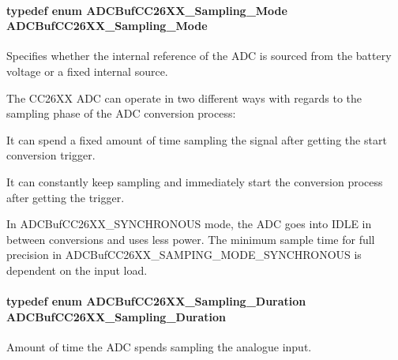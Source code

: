 \paragraph[{A\+D\+C\+Buf\+C\+C26\+X\+X\+\_\+\+Sampling\+\_\+\+Mode}]{\setlength{\rightskip}{0pt plus 5cm}typedef enum {\bf A\+D\+C\+Buf\+C\+C26\+X\+X\+\_\+\+Sampling\+\_\+\+Mode}  {\bf A\+D\+C\+Buf\+C\+C26\+X\+X\+\_\+\+Sampling\+\_\+\+Mode}}\label{_a_d_c_buf_c_c26_x_x_8h_a49a153bb66450bc16c5e2ac674fad698}


Specifies whether the internal reference of the A\+D\+C is sourced from the battery voltage or a fixed internal source. 

The C\+C26\+X\+X A\+D\+C can operate in two different ways with regards to the sampling phase of the A\+D\+C conversion process\+:
\begin{DoxyItemize}
\item It can spend a fixed amount of time sampling the signal after getting the start conversion trigger.
\item It can constantly keep sampling and immediately start the conversion process after getting the trigger.
\end{DoxyItemize}

In A\+D\+C\+Buf\+C\+C26\+X\+X\+\_\+\+S\+Y\+N\+C\+H\+R\+O\+N\+O\+U\+S mode, the A\+D\+C goes into I\+D\+L\+E in between conversions and uses less power. The minimum sample time for full precision in A\+D\+C\+Buf\+C\+C26\+X\+X\+\_\+\+S\+A\+M\+P\+I\+N\+G\+\_\+\+M\+O\+D\+E\+\_\+\+S\+Y\+N\+C\+H\+R\+O\+N\+O\+U\+S is dependent on the input load. 
\paragraph[{A\+D\+C\+Buf\+C\+C26\+X\+X\+\_\+\+Sampling\+\_\+\+Duration}]{\setlength{\rightskip}{0pt plus 5cm}typedef enum {\bf A\+D\+C\+Buf\+C\+C26\+X\+X\+\_\+\+Sampling\+\_\+\+Duration}  {\bf A\+D\+C\+Buf\+C\+C26\+X\+X\+\_\+\+Sampling\+\_\+\+Duration}}\label{_a_d_c_buf_c_c26_x_x_8h_aeccab39075ab39a107100cfbbc473c47}


Amount of time the A\+D\+C spends sampling the analogue input. 

